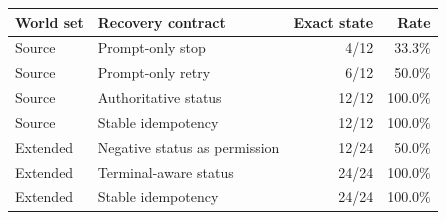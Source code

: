 \begin{tabular}{llrr}
\toprule
World set & Recovery contract & Exact state & Rate \\
\midrule
Source & Prompt-only stop & 4/12 & 33.3\% \\
Source & Prompt-only retry & 6/12 & 50.0\% \\
Source & Authoritative status & 12/12 & 100.0\% \\
Source & Stable idempotency & 12/12 & 100.0\% \\
Extended & Negative status as permission & 12/24 & 50.0\% \\
Extended & Terminal-aware status & 24/24 & 100.0\% \\
Extended & Stable idempotency & 24/24 & 100.0\% \\
\bottomrule
\end{tabular}
